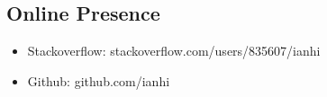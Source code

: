 \documentclass[margin]{res}
\begin{document}
\begin{resume}
	\section{Online Presence}
	\begin{itemize} \itemsep -2pt  %
		\item Stackoverflow: stackoverflow.com/users/835607/ianhi
		\item Github:  github.com/ianhi 
	\end{itemize}


	
\end{resume} 
\end{document}
